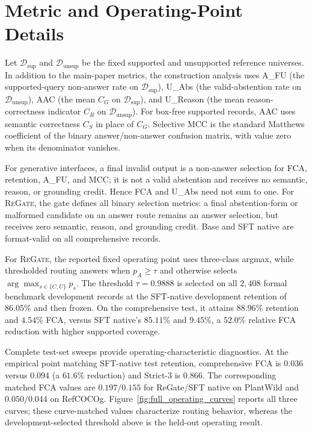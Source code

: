 \documentclass[letterpaper]{article}
\newcommand{\Method}{\textsc{ReGate}\xspace}
\begin{document}
\section{Metric and Operating-Point Details}
\label{sec:metric_operating_details}

Let $\mathcal D_{\mathrm{sup}}$ and $\mathcal D_{\mathrm{unsup}}$ be the fixed supported and unsupported reference universes. In addition to the main-paper metrics, the construction analysis uses A\_FU (the supported-query non-answer rate on $\mathcal D_{\mathrm{sup}}$), U\_Abs (the valid-abstention rate on $\mathcal D_{\mathrm{unsup}}$), AAC (the mean $C_G$ on $\mathcal D_{\mathrm{sup}}$), and U\_Reason (the mean reason-correctness indicator $C_R$ on $\mathcal D_{\mathrm{unsup}}$). For box-free supported records, AAC uses semantic correctness $C_S$ in place of $C_G$. Selective MCC is the standard Matthews coefficient of the binary answer/non-answer confusion matrix, with value zero when its denominator vanishes.

For generative interfaces, a final invalid output is a non-answer selection for FCA, retention, A\_FU, and MCC; it is not a valid abstention and receives no semantic, reason, or grounding credit. Hence FCA and U\_Abs need not sum to one. For \Method, the gate defines all binary selection metrics: a final abstention-form or malformed candidate on an answer route remains an answer selection, but receives zero semantic, reason, and grounding credit.
Base and SFT native are format-valid on all comprehensive records.

For \Method, the reported fixed operating point uses three-class argmax, while thresholded routing answers when $p_A\geq\tau$ and otherwise selects $\arg\max_{s\in\{C,U\}}p_s$. The threshold $\tau=0.9888$ is selected on all $2{,}408$ formal benchmark development records at the SFT-native development retention of $86.05\%$ and then frozen. On the comprehensive test, it attains $88.96\%$ retention and $4.54\%$ FCA, versus SFT native's $85.11\%$ and $9.45\%$, a $52.0\%$ relative FCA reduction with higher supported coverage.

Complete test-set sweeps provide operating-characteristic diagnostics. At the empirical point matching SFT-native test retention, comprehensive FCA is $0.036$ versus $0.094$ (a $61.6\%$ reduction) and Strict-3 is $0.866$. The corresponding matched FCA values are $0.197/0.155$ for ReGate/SFT native on PlantWild and $0.050/0.044$ on RefCOCOg. Figure~\ref{fig:full_operating_curves} reports all three curves; these curve-matched values characterize routing behavior, whereas the development-selected threshold above is the held-out operating result.
\end{document}
